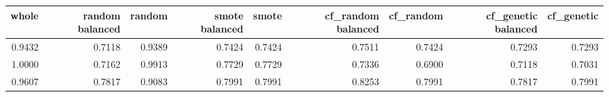 \begin{tabular}{rrrrrrrrr}
\toprule

 whole &  random balanced &  random &  smote balanced &  smote &  cf\_random balanced &  cf\_random &  cf\_genetic balanced &  cf\_genetic \\
\midrule

0.9432 &           0.7118 &  0.9389 &          0.7424 & 0.7424 &              0.7511 &     0.7424 &               0.7293 &      0.7293 \\
1.0000 &           0.7162 &  0.9913 &          0.7729 & 0.7729 &              0.7336 &     0.6900 &               0.7118 &      0.7031 \\
0.9607 &           0.7817 &  0.9083 &          0.7991 & 0.7991 &              0.8253 &     0.7991 &               0.7817 &      0.7991 \\

\bottomrule
\end{tabular}
